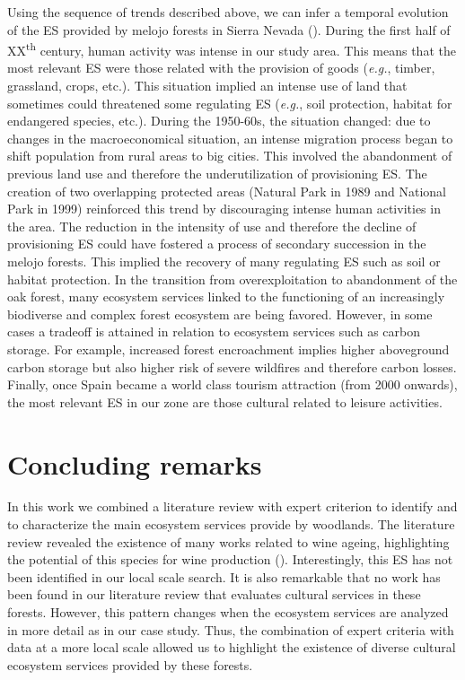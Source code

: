 Using the sequence of trends described above, we can infer a temporal evolution of the ES provided by melojo forests in Sierra Nevada (). During the first half of XX\textsuperscript{th} century, human activity was intense in our study area. This means that the most relevant ES were those related with the provision of goods (\emph{e.g.}, timber, grassland, crops, etc.). This situation implied an intense use of land that sometimes could threatened some regulating ES (\emph{e.g.}, soil protection, habitat for endangered species, etc.). During the 1950-60s, the situation changed: due to changes in the macroeconomical situation, an intense migration process began to shift population from rural areas to big cities. This involved the abandonment of previous land use and therefore the underutilization of provisioning ES. The creation of two overlapping protected areas (Natural Park in 1989 and National Park in 1999) reinforced this trend by discouraging intense human activities in the area. The reduction in the intensity of use and therefore the decline of  provisioning ES could have fostered a process of secondary succession in the melojo forests. This implied the recovery of many regulating ES such as soil or habitat protection. In the transition from overexploitation to abandonment of the oak forest, many ecosystem services linked to the functioning of an increasingly biodiverse and complex forest ecosystem are being favored. However, in some cases a tradeoff is attained in relation to ecosystem services such as carbon storage. For example, increased forest encroachment implies higher aboveground carbon storage but also higher risk of severe wildfires and therefore carbon losses. Finally, once Spain became a world class tourism attraction (from 2000 onwards), the most relevant ES in our zone are those cultural related to leisure activities.

\section{Concluding remarks}\label{sec:es:concluding} 

In this work we combined a literature review with expert criterion to identify and to characterize the main ecosystem services provide by \Qp woodlands. The literature review revealed the existence of many works related to wine ageing, highlighting the potential of this species for wine production (). Interestingly, this ES has not been identified in our local scale search. It is also remarkable that no work has been found in our literature review that evaluates cultural services in these forests. However, this pattern changes when the ecosystem services are analyzed in more detail as in our case study. Thus, the combination of expert criteria with data at a more local scale allowed us to highlight the existence of diverse cultural ecosystem services provided by these forests. 

